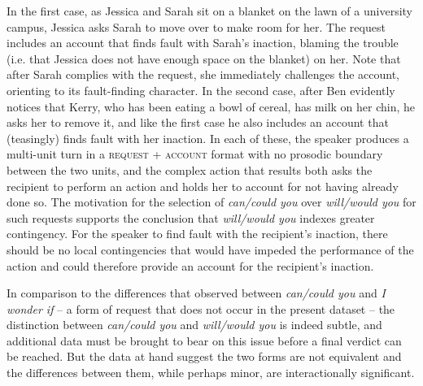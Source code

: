 \documentclass[output=paper,nonflat,modfont,draft]{langsci/langscibook}
\begin{document}
In the first case, as Jessica and Sarah sit on a blanket on the lawn of a university campus, Jessica asks Sarah to move over to make room for her. The request includes an account that finds fault with Sarah’s inaction, blaming the trouble (i.e. that Jessica does not have enough space on the blanket) on her. Note that after Sarah complies with the request, she immediately challenges the account, orienting to its fault-finding character. In the second case, after Ben evidently notices that Kerry, who has been eating a bowl of cereal, has milk on her chin, he asks her to remove it, and like the first case he also includes an account that (teasingly) finds fault with her inaction. In each of these, the speaker produces a multi-unit turn in a \textsc{request} + \textsc{account} format with no prosodic boundary between the two units, and the complex action that results both asks the recipient to perform an action and holds her to account for not having already done so. The motivation for the selection of \textit{can/could you} over \textit{will/would you} for such requests supports the conclusion that\textit{ will/would you} indexes greater contingency. For the speaker to find fault with the recipient’s inaction, there should be no local contingencies that would have impeded the performance of the action and could therefore provide an account for the recipient’s inaction.

In comparison to the differences that \citet{curl_contingency_2008} observed between \textit{can/could you} and \textit{I wonder if} -- a form of request that does not occur in the present dataset -- the distinction between \textit{can/could you} and \textit{will/would you} is indeed subtle, and additional data must be brought to bear on this issue before a final verdict can be reached. But the data at hand suggest the two forms are not equivalent and the differences between them, while perhaps minor, are interactionally significant.
\end{document}
